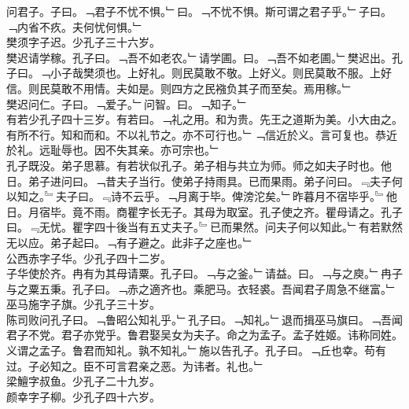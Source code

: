 \documentclass{zhvt-classic}
\begin{document}
\hspace*{2em}问君子。子曰。﹁君子不忧不惧。﹂曰。﹁不忧不惧。斯可谓之君子乎。﹂子曰。﹁内省不疚。夫何忧何惧。﹂\\
\hspace*{2em}樊须字子迟。少孔子三十六岁。\\
\hspace*{2em}樊迟请学稼。孔子曰。﹁吾不如老农。﹂请学圃。曰。﹁吾不如老圃。﹂樊迟出。孔子曰。﹁小子哉樊须也。上好礼。则民莫敢不敬。上好义。则民莫敢不服。上好信。则民莫敢不用情。夫如是。则四方之民襁负其子而至矣。焉用稼。﹂\\
\hspace*{2em}樊迟问仁。子曰。﹁爱子。﹂问智。曰。﹁知子。﹂\\
\hspace*{2em}有若少孔子四十三岁。有若曰。﹁礼之用。和为贵。先王之道斯为美。小大由之。有所不行。知和而和。不以礼节之。亦不可行也。﹂﹁信近於义。言可复也。恭近於礼。远耻辱也。因不失其亲。亦可宗也。﹂\\
\hspace*{2em}孔子既没。弟子思慕。有若状似孔子。弟子相与共立为师。师之如夫子时也。他日。弟子进问曰。﹁昔夫子当行。使弟子持雨具。已而果雨。弟子问曰。﹃夫子何以知之。﹄夫子曰。﹃诗不云乎。﹁月离于毕。俾滂沱矣。﹂昨暮月不宿毕乎。﹄他日。月宿毕。竟不雨。商瞿字长无子。其母为取室。孔子使之齐。瞿母请之。孔子曰。﹃无忧。瞿字四十後当有五丈夫子。﹄已而果然。问夫子何以知此。﹂有若默然无以应。弟子起曰。﹁有子避之。此非子之座也。﹂\\
\hspace*{2em}公西赤字子华。少孔子四十二岁。\\
\hspace*{2em}子华使於齐。冉有为其母请粟。孔子曰。﹁与之釜。﹂请益。曰。﹁与之庾。﹂冉子与之粟五秉。孔子曰。﹁赤之適齐也。乘肥马。衣轻裘。吾闻君子周急不继富。﹂\\
\hspace*{2em}巫马施字子旗。少孔子三十岁。\\
\hspace*{2em}陈司败问孔子曰。﹁鲁昭公知礼乎。﹂孔子曰。﹁知礼。﹂退而揖巫马旗曰。﹁吾闻君子不党。君子亦党乎。鲁君娶吴女为夫子。命之为孟子。孟子姓姬。讳称同姓。义谓之孟子。鲁君而知礼。孰不知礼。﹂施以告孔子。孔子曰。﹁丘也幸。苟有过。子必知之。臣不可言君亲之恶。为讳者。礼也。﹂\\
\hspace*{2em}梁鱣字叔鱼。少孔子二十九岁。\\
\hspace*{2em}颜幸字子柳。少孔子四十六岁。\\
\end{document}
